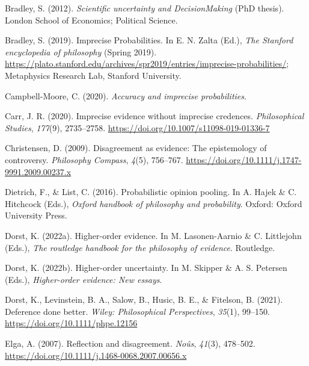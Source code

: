 \documentclass[
  10pt,
  dvipsnames,enabledeprecatedfontcommands]{scrartcl}
\newlength{\cslhangindent}
\newlength{\cslentryspacingunit} %
\newenvironment{CSLReferences}[2] %
 {%
  \setlength{\parindent}{0pt}
  \ifodd #1
  \let\oldpar\par
  \def\par{\hangindent=\cslhangindent\oldpar}
  \fi
  \setlength{\parskip}{#2\cslentryspacingunit}
 }%
 {}
\begin{document}
\hypertarget{refs}{}
\begin{CSLReferences}{1}{0}
\leavevmode{}%
Bradley, S. (2012). \emph{Scientific uncertainty and DecisionMaking}
(PhD thesis). London School of Economics; Political Science.

\leavevmode{}%
Bradley, S. (2019). {Imprecise Probabilities}. In E. N. Zalta (Ed.),
\emph{The {Stanford} encyclopedia of philosophy} ({S}pring 2019).
\url{https://plato.stanford.edu/archives/spr2019/entries/imprecise-probabilities/};
Metaphysics Research Lab, Stanford University.

\leavevmode{}%
Campbell-Moore, C. (2020). \emph{Accuracy and imprecise probabilities}.

\leavevmode{}%
Carr, J. R. (2020). Imprecise evidence without imprecise credences.
\emph{Philosophical Studies}, \emph{177}(9), 2735--2758.
\url{https://doi.org/10.1007/s11098-019-01336-7}

\leavevmode{}%
Christensen, D. (2009). Disagreement as evidence: The epistemology of
controversy. \emph{Philosophy Compass}, \emph{4}(5), 756--767.
\url{https://doi.org/10.1111/j.1747-9991.2009.00237.x}

\leavevmode{}%
Dietrich, F., \& List, C. (2016). Probabilistic opinion pooling. In A.
Hajek \& C. Hitchcock (Eds.), \emph{Oxford handbook of philosophy and
probability}. Oxford: Oxford University Press.

\leavevmode{}%
Dorst, K. (2022a). Higher-order evidence. In M. Lasonen-Aarnio \& C.
Littlejohn (Eds.), \emph{The routledge handbook for the philosophy of
evidence}. Routledge.

\leavevmode{}%
Dorst, K. (2022b). Higher-order uncertainty. In M. Skipper \& A. S.
Petersen (Eds.), \emph{Higher-order evidence: New essays}.

\leavevmode{}%
Dorst, K., Levinstein, B. A., Salow, B., Husic, B. E., \& Fitelson, B.
(2021). Deference done better. \emph{Wiley: Philosophical Perspectives},
\emph{35}(1), 99--150. \url{https://doi.org/10.1111/phpe.12156}

\leavevmode{}%
Elga, A. (2007). Reflection and disagreement. \emph{Noûs}, \emph{41}(3),
478--502. \url{https://doi.org/10.1111/j.1468-0068.2007.00656.x}


\end{CSLReferences}
\end{document}
